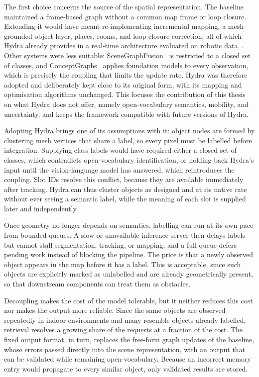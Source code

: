 {\small The first choice concerns the source of the spatial representation. The baseline maintained a frame-based graph without a common map frame or loop closure. Extending it would have meant re-implementing incremental mapping, a mesh-grounded object layer, places, rooms, and loop-closure correction, all of which Hydra already provides in a real-time architecture evaluated on robotic data~\cite{hughes2022hydra}. Other systems were less suitable: SceneGraphFusion~\cite{wu2021scenegraphfusion} is restricted to a closed set of classes, and ConceptGraphs~\cite{gu2024conceptgraphs} applies foundation models to every observation, which is precisely the coupling that limits the update rate. Hydra was therefore adopted and deliberately kept close to its original form, with its mapping and optimisation algorithms unchanged. This focuses the contribution of this thesis on what Hydra does not offer, namely open-vocabulary semantics, mobility, and uncertainty, and keeps the framework compatible with future versions of Hydra.\par}

{\small Adopting Hydra brings one of its assumptions with it: object nodes are formed by clustering mesh vertices that share a label, so every pixel must be labelled before integration. Supplying class labels would have required either a closed set of classes, which contradicts open-vocabulary identification, or holding back Hydra's input until the vision-language model has answered, which reintroduces the coupling. Slot IDs resolve this conflict, because they are available immediately after tracking. Hydra can thus cluster objects as designed and at its native rate without ever seeing a semantic label, while the meaning of each slot is supplied later and independently.\par}

{\small Once geometry no longer depends on semantics, labelling can run at its own pace from bounded queues. A slow or unavailable inference server then delays labels but cannot stall segmentation, tracking, or mapping, and a full queue defers pending work instead of blocking the pipeline. The price is that a newly observed object appears in the map before it has a label. This is acceptable, since such objects are explicitly marked as unlabelled and are already geometrically present, so that downstream components can treat them as obstacles.\par}

{\small Decoupling makes the cost of the model tolerable, but it neither reduces this cost nor makes the output more reliable. Since the same objects are observed repeatedly in indoor environments and many resemble objects already labelled, retrieval resolves a growing share of the requests at a fraction of the cost. The fixed output format, in turn, replaces the free-form graph updates of the baseline, whose errors passed directly into the scene representation, with an output that can be validated while remaining open-vocabulary. Because an incorrect memory entry would propagate to every similar object, only validated results are stored.\par}

